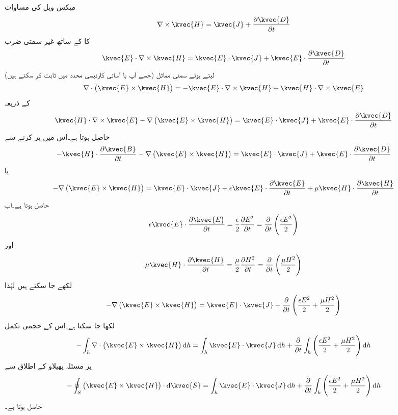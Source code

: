 میکس ویل کی مساوات 
\begin{align*}
\nabla \times \kvec{H}=\kvec{J}+\frac{\partial \kvec{D}}{\partial t}
\end{align*}
کا  کے ساتھ غیر سمتی ضرب
\begin{align*}
\kvec{E} \cdot \nabla \times \kvec{H}=\kvec{E} \cdot \kvec{J}+\kvec{E} \cdot \frac{\partial \kvec{D}}{\partial t}
\end{align*}
لیتے ہوئے سمتی مماثل (جسے آپ با آسانی کارتیسی محدد میں ثابت کر سکتے ہیں)
\begin{align*}
\nabla \cdot \left(\kvec{E} \times \kvec{H} \right)=-\kvec{E} \cdot \nabla \times \kvec{H}+\kvec{H} \cdot \nabla \times \kvec{E}
\end{align*}
کے ذریعہ
\begin{align*}
\kvec{H} \cdot \nabla \times \kvec{E}-\nabla \left(\kvec{E} \times \kvec{H}\right)=\kvec{E} \cdot \kvec{J}+\kvec{E} \cdot \frac{\partial \kvec{D}}{\partial t}
\end{align*}
حاصل ہوتا ہے۔اس میں  پر کرنے سے
\begin{align*}
-\kvec{H} \cdot \frac{\partial \kvec{B}}{\partial t}-\nabla \left(\kvec{E} \times \kvec{H}\right)=\kvec{E} \cdot \kvec{J}+\kvec{E} \cdot \frac{\partial \kvec{D}}{\partial t}
\end{align*}
یا
\begin{align*}
-\nabla \left(\kvec{E} \times \kvec{H}\right)=\kvec{E} \cdot \kvec{J}+\epsilon \kvec{E} \cdot \frac{\partial \kvec{E}}{\partial t}+\mu \kvec{H} \cdot \frac{\partial \kvec{H}}{\partial t}
\end{align*}
حاصل ہوتا ہے۔اب
\begin{align*}
\epsilon \kvec{E} \cdot \frac{\partial \kvec{E}}{\partial t}=\frac{\epsilon}{2}\frac{\partial E^2}{\partial t}=\frac{\partial}{\partial t} \left(\frac{\epsilon E^2}{2} \right)
\end{align*}
اور
\begin{align*}
\mu \kvec{H} \cdot \frac{\partial \kvec{H}}{\partial t}=\frac{\mu}{2}\frac{\partial H^2}{\partial t}=\frac{\partial}{\partial t} \left(\frac{\mu H^2}{2} \right)
\end{align*}
لکھے جا سکتے ہیں لہٰذا
\begin{align*}
-\nabla \left(\kvec{E} \times \kvec{H}\right)=\kvec{E} \cdot \kvec{J}+\frac{\partial}{\partial t} \left(\frac{\epsilon E^2}{2} + \frac{\mu H^2}{2} \right)
\end{align*}
لکھا جا سکتا ہے۔اس کے حجمی تکمل
\begin{align*}
-\int_h \nabla \cdot \left(\kvec{E}\times \kvec{H} \right) \dif h=\int_h \kvec{E} \cdot \kvec{J} \dif h+\frac{\partial}{\partial t}\int_h \left(\frac{\epsilon E^2}{2} + \frac{\mu H^2}{2}  \right) \dif h
\end{align*}
پر مسئلہ پھیلاو کے اطلاق سے
\begin{align}
-\oint_S \left(\kvec{E}\times \kvec{H} \right) \cdot \dif \kvec{S}=\int_h \kvec{E} \cdot \kvec{J} \dif h+\frac{\partial}{\partial t}\int_h \left(\frac{\epsilon E^2}{2} + \frac{\mu H^2}{2}  \right) \dif h
\end{align}
حاصل ہوتا ہے۔

